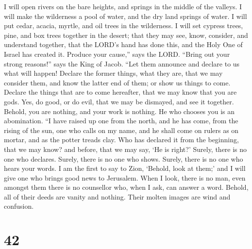 I will open rivers on the bare heights, and springs in the
middle of the valleys. I will make the wilderness a pool of water, and
the dry land springs of water.  I will put cedar, acacia,
myrtle, and oil trees in the wilderness. I will set cypress trees, pine,
and box trees together in the desert;  that they may see,
know, consider, and understand together, that the LORD's hand has done
this, and the Holy One of Israel has created it.  Produce
your cause,'' says the LORD. ``Bring out your strong reasons!'' says the
King of Jacob.  ``Let them announce and declare to us what
will happen! Declare the former things, what they are, that we may
consider them, and know the latter end of them; or show us things to
come.  Declare the things that are to come hereafter, that
we may know that you are gods. Yes, do good, or do evil, that we may be
dismayed, and see it together.  Behold, you are nothing,
and your work is nothing. He who chooses you is an abomination.
 ``I have raised up one from the north, and he has come,
from the rising of the sun, one who calls on my name, and he shall come
on rulers as on mortar, and as the potter treads clay.  Who
has declared it from the beginning, that we may know? and before, that
we may say, `He is right?' Surely, there is no one who declares. Surely,
there is no one who shows. Surely, there is no one who hears your words.
 I am the first to say to Zion, `Behold, look at them;' and
I will give one who brings good news to Jerusalem.  When I
look, there is no man, even amongst them there is no counsellor who,
when I ask, can answer a word.  Behold, all of their deeds
are vanity and nothing. Their molten images are wind and confusion.

\hypertarget{section-41}{%
\section{42}\label{section-41}}

